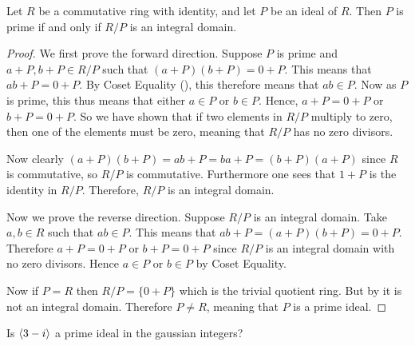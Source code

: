 \begin{theorem}\label{thrm-prime-ideal-iff-quotient-ring-is-integral-domain}
    Let $R$ be a commutative ring with identity, and let $P$ be an ideal of $R$. Then $P$ is prime if and only if $R/P$ is an integral domain.
\end{theorem}
\begin{proof}
    We first prove the forward direction. Suppose $P$ is prime and $a+P, b+P \in R/P$ such that $(a+P)(b+P) = 0+P$. This means that $ab + P = 0 + P$. By Coset Equality (), this therefore means that $ab \in P$. Now as $P$ is prime, this thus means that either $a \in P$ or $b \in P$. Hence, $a + P = 0 + P$ or $b + P = 0 + P$. So we have shown that if two elements in $R/P$ multiply to zero, then one of the elements must be zero, meaning that $R/P$ has no zero divisors.
    
    Now clearly $(a+P)(b+P) = ab + P = ba + P = (b+P)(a+P)$ since $R$ is commutative, so $R/P$ is commutative. Furthermore one sees that $1 + P$ is the identity in $R/P$. Therefore, $R/P$ is an integral domain.

    Now we prove the reverse direction. Suppose $R/P$ is an integral domain. Take $a,b \in R$ such that $ab \in P$. This means that $ab + P = (a+P)(b+P) = 0 + P$. Therefore $a+P = 0 + P$ or $b + P = 0 + P$ since $R/P$ is an integral domain with no zero divisors. Hence $a \in P$ or $b \in P$ by Coset Equality.
    
    Now if $P = R$ then $R/P = \{0 + P\}$ which is the trivial quotient ring. But by  it is not an integral domain. Therefore $P \neq R$, meaning that $P$ is a prime ideal.
\end{proof}
\begin{exercise}
    Is $\left\langle3 - i\right\rangle$ a prime ideal in the gaussian integers?
\end{exercise}

